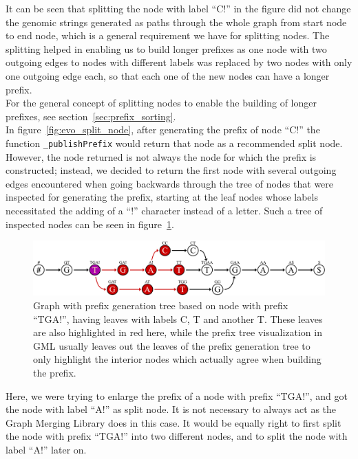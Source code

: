 \documentclass[a4paper,12pt,twoside,BCOR=10mm]{scrbook}
\begin{document}
It can be seen that splitting the node with label “C!” in the figure did not change the
genomic strings generated as paths through the whole graph from start node to end node,
which is a general requirement we have for splitting nodes.
The splitting helped in enabling us to build longer prefixes as one node with
two outgoing edges to nodes with different labels was replaced by two nodes
with only one outgoing edge each, so that each one of the new nodes can
have a longer prefix. \\
For the general concept of splitting nodes to
enable the building of longer prefixes, see section~\ref{sec:prefix_sorting}. \\
In figure~\ref{fig:evo_split_node},
after generating the prefix of node “C!” the function \texttt{\_publishPrefix} would
return that node as a recommended split node. However, the node returned is
not always the node for which the prefix is constructed; instead, we decided to return the first node
with several outgoing edges encountered when going backwards through the tree of nodes
that were inspected for generating the prefix, starting at the leaf nodes whose labels
necessitated the adding of a “!” character instead of a letter.
Such a tree of inspected nodes can be seen in figure~\ref{fig:evo_node_splitting_tree}.
\begin{figure}[!htb]
\centering
\includegraphics[width=\textwidth]{evo_node_splitting_tree.pdf}
\caption[Graph with prefix generation tree]{Graph with prefix generation tree based on node with prefix \textup{“TGA!”}, having leaves with labels \textup{C, T} and another \textup{T}. These leaves are also highlighted in red here, while the prefix tree visualization in GML usually leaves out the leaves of the prefix generation tree to only highlight the interior nodes which actually agree when building the prefix.} \label{fig:evo_node_splitting_tree}
\end{figure}
Here, we were trying to enlarge the prefix of a node with prefix “TGA!”,
and got the node with label “A!” as split node.
It is not necessary to always act as the Graph Merging Library does in this case.
It would be equally right to first split the node with prefix “TGA!” into two different nodes,
and to split the node with label “A!” later on.
\end{document}
